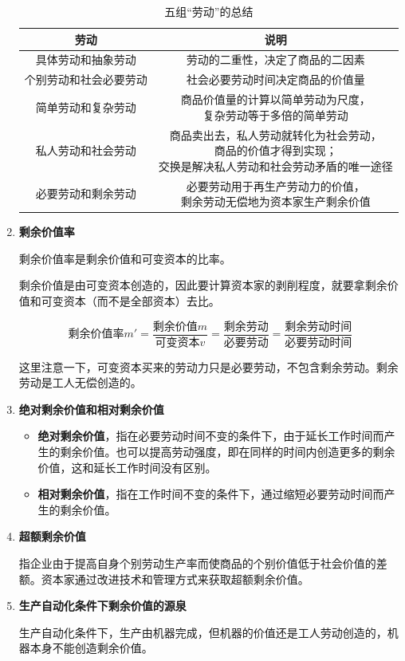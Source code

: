 \documentclass[12pt, a4paper, oneside]{ctexart}
\begin{document}
\begin{enumerate}
  \begin{table}[h]
    \centering
    \caption{五组“劳动”的总结}
    \begin{tabular}{|c|c|}
      \hline
      \textbf{劳动} & \textbf{说明} \\ \hline
      具体劳动和抽象劳动 & 劳动的二重性，决定了商品的二因素 \\ \hline
      个别劳动和社会必要劳动 & 社会必要劳动时间决定商品的价值量 \\ \hline
      简单劳动和复杂劳动 & \makecell{商品价值量的计算以简单劳动为尺度，\\ 复杂劳动等于多倍的简单劳动} \\ \hline
      私人劳动和社会劳动 & \makecell{商品卖出去，私人劳动就转化为社会劳动，\\ 商品的价值才得到实现；\\ 交换是解决私人劳动和社会劳动矛盾的唯一途径} \\ \hline
      必要劳动和剩余劳动 & \makecell{必要劳动用于再生产劳动力的价值，\\ 剩余劳动无偿地为资本家生产剩余价值} \\
      \hline
    \end{tabular}
  \end{table}

  \item {\bf 剩余价值率}
  
  剩余价值率是剩余价值和可变资本的比率。

  剩余价值是由可变资本创造的，因此要计算资本家的剥削程度，就要拿剩余价值和可变资本（而不是全部资本）去比。

  \begin{equation*}
    \text{剩余价值率}m'=\frac{\text{剩余价值}m}{\text{可变资本}v}=\frac{\text{剩余劳动}}{\text{必要劳动}}=\frac{\text{剩余劳动时间}}{\text{必要劳动时间}}
  \end{equation*}

  这里注意一下，可变资本买来的劳动力只是必要劳动，不包含剩余劳动。剩余劳动是工人无偿创造的。

  \item {\bf 绝对剩余价值和相对剩余价值}
  
  \begin{itemize}
    \item {\bf 绝对剩余价值}，指在必要劳动时间不变的条件下，由于延长工作时间而产生的剩余价值。也可以提高劳动强度，即在同样的时间内创造更多的剩余价值，这和延长工作时间没有区别。
    \item {\bf 相对剩余价值}，指在工作时间不变的条件下，通过缩短必要劳动时间而产生的剩余价值。
  \end{itemize}

  \item {\bf 超额剩余价值}
  
  指企业由于提高自身个别劳动生产率而使商品的个别价值低于社会价值的差额。资本家通过改进技术和管理方式来获取超额剩余价值。

  \item {\bf 生产自动化条件下剩余价值的源泉}
  
  生产自动化条件下，生产由机器完成，但机器的价值还是工人劳动创造的，机器本身不能创造剩余价值。

\end{enumerate}
\end{document}
